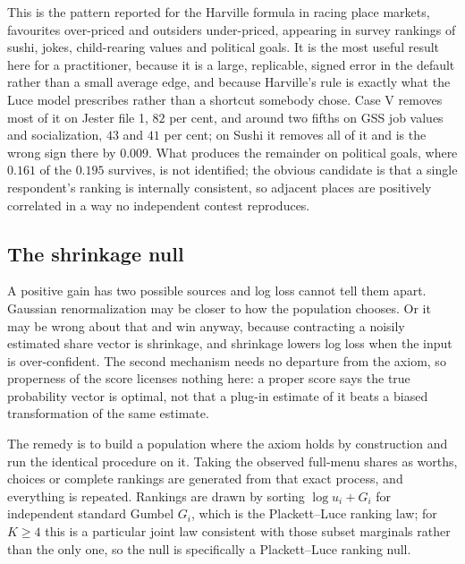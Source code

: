 \documentclass[11pt]{article}
\begin{document}
This is the pattern reported for the Harville formula in racing place markets, favourites
over-priced and outsiders under-priced, appearing in survey rankings of sushi, jokes,
child-rearing values and political goals. It is the most useful result here for a
practitioner, because it is a large, replicable, signed error in the default rather than a
small average edge, and because Harville's rule is exactly what the Luce model prescribes rather
than a shortcut somebody chose. Case V removes most of it on Jester file 1, $82$ per cent, and
around two fifths on GSS job values and socialization, $43$ and $41$ per cent; on Sushi it removes
all of it and is the wrong sign there by $0.009$. What produces the remainder on political goals,
where $0.161$ of the $0.195$ survives, is not identified; the obvious candidate is that a single
respondent's ranking is internally consistent, so adjacent places are positively correlated in a
way no independent contest reproduces.

\subsection{The shrinkage null}
\label{sec:null}

A positive gain has two possible sources and log loss cannot tell them apart. Gaussian
renormalization may be closer to how the population chooses. Or it may be wrong about that and
win anyway, because contracting a noisily estimated share vector is shrinkage, and
shrinkage lowers log loss when the input is over-confident. The second mechanism needs
no departure from the axiom, so properness of the score licenses nothing here: a proper
score says the true probability vector is optimal, not that a plug-in estimate of it
beats a biased transformation of the same estimate.

The remedy is to build a population where the axiom holds by construction and run the
identical procedure on it. Taking the observed full-menu shares as worths, choices or
complete rankings are generated from that exact process, and everything is repeated.
Rankings are drawn by sorting $\log u_i + G_i$ for independent standard Gumbel $G_i$,
which is the Plackett--Luce ranking law; for $K \ge 4$ this is a particular joint law
consistent with those subset marginals rather than the only one, so the null is
specifically a Plackett--Luce ranking null.
\end{document}
